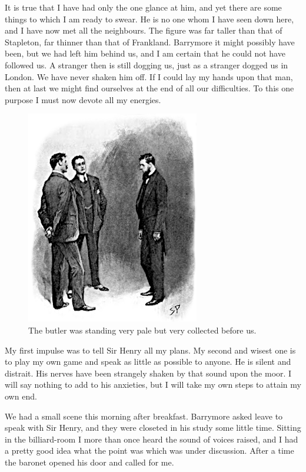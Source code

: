 \documentclass[paper=a5,BCOR=7mm,twoside,DIV=calc,12pt,usegeometry,openany,chapterprefix,endperiod,headings=big]{scrbook} %
\begin{document}
It is true that I have had only the one glance at him, and yet there are some things to which I am ready to swear. He is no one whom I have seen down here, and I have now met all the neighbours. The figure was far taller than that of Stapleton, far thinner than that of Frankland. Barrymore it might possibly have been, but we had left him behind us, and I am certain that he could not have followed us. A stranger then is still dogging us, just as a stranger dogged us in London. We have never shaken him off. If I could lay my hands upon that man, then at last we might find ourselves at the end of all our difficulties. To this one purpose I must now devote all my energies.

\begin{figure}
\centering
\includegraphics[width=.7\linewidth]{10_butlerstand}
\caption{The butler was standing very pale but very collected before us.}
\end{figure}

My first impulse was to tell Sir Henry all my plans. My second and wisest one is to play my own game and speak as little as possible to anyone. He is silent and distrait. His nerves have been strangely shaken by that sound upon the moor. I will say nothing to add to his anxieties, but I will take my own steps to attain my own end.

We had a small scene this morning after breakfast. Barrymore asked leave to speak with Sir Henry, and they were closeted in his study some little time. Sitting in the billiard-room I more than once heard the sound of voices raised, and I had a pretty good idea what the point was which was under discussion. After a time the baronet opened his door and called for me.
\end{document}
